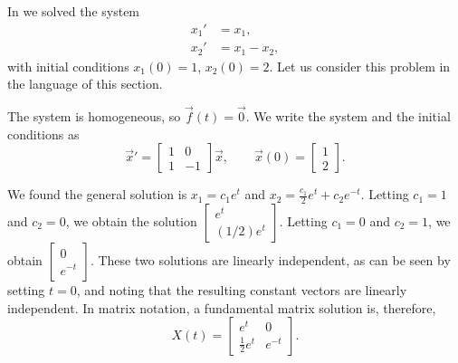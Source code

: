 \begin{example}
In  we solved the system
\begin{align*}
x_1' & = x_1 , \\
x_2' & = x_1 - x_2 ,
\end{align*}
with initial conditions $x_1(0) = 1$, $x_2(0) = 2$.
Let us consider this problem in the language of this section.

The system is homogeneous, so $\vec{f}(t) = \vec{0}$.
We write the system and the initial conditions as
\begin{equation*}
{\vec{x}}'
=
\begin{bmatrix}
1 & 0 \\
1 & -1
\end{bmatrix}
\vec{x} ,
\qquad
\vec{x}(0) = 
\begin{bmatrix}
1 \\
2
\end{bmatrix} .
\end{equation*}

We found the general solution is
$x_1 = c_1 e^t $ and
$x_2 = \frac{c_1}{2}e^{t} + c_2e^{-t}$. 
Letting $c_1=1$ and $c_2=0$, we obtain the solution
$\left[ \begin{smallmatrix} e^t \\ (1/2) e^t \end{smallmatrix} \right]$.
Letting $c_1=0$ and $c_2=1$, we obtain
$\left[ \begin{smallmatrix} 0 \\ e^{-t} \end{smallmatrix} \right]$.
These two solutions are linearly independent,
as can be seen by setting
$t=0$, and noting that the resulting constant vectors are
linearly independent.
In matrix notation, a fundamental matrix solution is, therefore,
\begin{equation*}
X(t) = 
\begin{bmatrix}
e^t & 0 \\
\frac{1}{2} e^t & e^{-t}
\end{bmatrix} .
\end{equation*}


\end{example}
